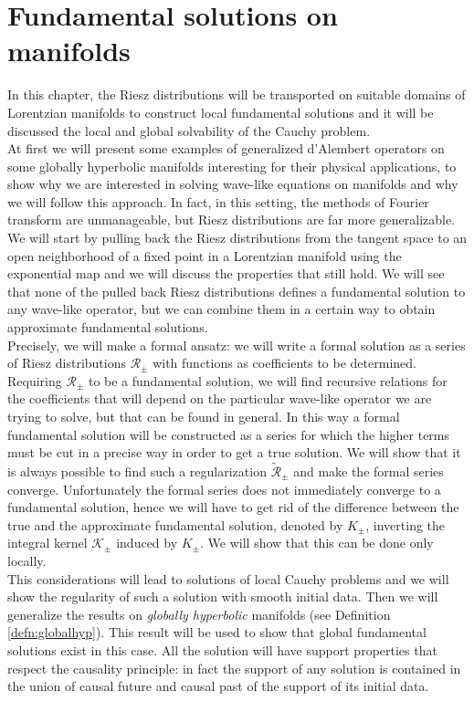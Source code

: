 \chapter{Fundamental solutions on manifolds}
\label{chapter3}


In this chapter, the Riesz distributions will be transported on suitable domains of Lorentzian manifolds to construct local fundamental solutions and it will be discussed the local and global solvability of the Cauchy problem.\\
At first we will present some examples of generalized d'Alembert operators on some globally hyperbolic manifolds interesting for their physical applications, to show why we are interested in solving wave-like equations on manifolds and why we will follow this approach. In fact, in this setting, the methods of Fourier transform are unmanageable, but Riesz distributions are far more generalizable.\\
We will start by pulling back the Riesz distributions from the tangent space to an open neighborhood of a fixed point in a Lorentzian manifold using the exponential map and we will discuss the properties that still hold. We will see that none of the pulled back Riesz distributions defines a fundamental solution to any wave-like operator, but we can combine them in a certain way to obtain approximate fundamental solutions.\\
Precisely, we will make a formal ansatz: we will write a formal solution as a series of Riesz distributions $\mathcal{R}_\pm$ with functions as coefficients to be determined. Requiring $\mathcal{R}_\pm$ to be a fundamental solution, we will find recursive relations for the coefficients that will depend on the particular wave-like operator we are trying to solve, but that can be found in general. In this way a formal fundamental solution will be constructed as a series for which the higher terms must be cut in a precise way in order to get a true solution. We will show that it is always possible to find such a regularization $\widetilde{\mathcal{R}}_\pm$ and make the formal series converge. Unfortunately the formal series does not immediately converge to a fundamental solution, hence we will have to get rid of the difference between the true and the approximate fundamental solution, denoted by $K_\pm$, inverting the integral kernel $\mathcal{K}_\pm$ induced by $K_\pm$. We will show that this can be done only locally.\\
This considerations will lead to solutions of local Cauchy problems and we will show the regularity of such a solution with smooth initial data. Then we will generalize the results on \emph{globally hyperbolic} manifolds (see Definition \ref{defn:globalhyp}). This result will be used to show that global fundamental solutions exist in this case. All the solution will have support properties that respect the causality principle: in fact the support of any solution is contained in the union of causal future and causal past of the support of its initial data.

